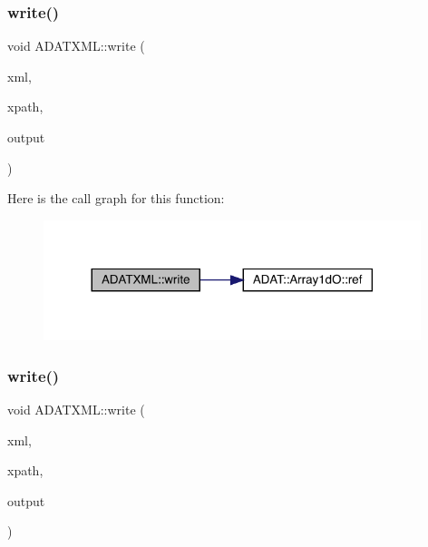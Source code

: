 \subsubsection{\texorpdfstring{write()}{write()}\hspace{0.1cm}{\footnotesize\ttfamily [52/58]}}
{\footnotesize\ttfamily void A\+D\+A\+T\+X\+M\+L\+::write (\begin{DoxyParamCaption}\item[{\mbox{\hyperlink{classADATXML_1_1XMLWriter}{X\+M\+L\+Writer}} \&}]{xml,  }\item[{const std\+::string \&}]{xpath,  }\item[{const \mbox{\hyperlink{classADAT_1_1Array1dO}{Array1dO}}$<$ short int $>$ \&}]{output }\end{DoxyParamCaption})}

Here is the call graph for this function\+:\nopagebreak
\begin{figure}[H]
\begin{center}
\leavevmode
\includegraphics[width=312pt]{d2/da3/group__io_ga0490b2b22643afb2ca599baccded2556_cgraph}
\end{center}
\end{figure}
\mbox{\label{group__io_gada32aa6101427e2983e6507da6d49ff2}} 
\subsubsection{\texorpdfstring{write()}{write()}\hspace{0.1cm}{\footnotesize\ttfamily [53/58]}}
{\footnotesize\ttfamily void A\+D\+A\+T\+X\+M\+L\+::write (\begin{DoxyParamCaption}\item[{\mbox{\hyperlink{classADATXML_1_1XMLWriter}{X\+M\+L\+Writer}} \&}]{xml,  }\item[{const std\+::string \&}]{xpath,  }\item[{const \mbox{\hyperlink{classADAT_1_1Array1dO}{Array1dO}}$<$ unsigned short int $>$ \&}]{output }\end{DoxyParamCaption})}


